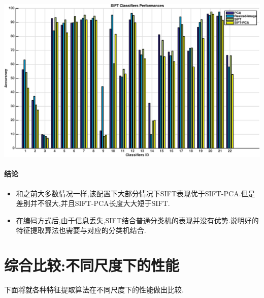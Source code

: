 	\begin{center}
	\begin{minipage}[t]{\linewidth}
	\center
	{
	\captionsetup{justification=centering}
	\includegraphics[width=\textwidth]{Img/c3/pni_sift_res} 
	}
	\end{minipage}
	\medskip
	\end{center}
\paragraph{结论}
\begin{itemize}
	\item 和之前大多数情况一样,该配置下大部分情况下SIFT表现优于SIFT-PCA.但是差别并不很大,并且SIFT-PCA长度大大短于SIFT.
	\item 在编码方式后,由于信息丢失,SIFT结合普通分类机的表现并没有优势.说明好的特征提取算法也需要与对应的分类机结合.
\end{itemize}

\section{综合比较:不同尺度下的性能}

下面将就各种特征提取算法在不同尺度下的性能做出比较. \newline

